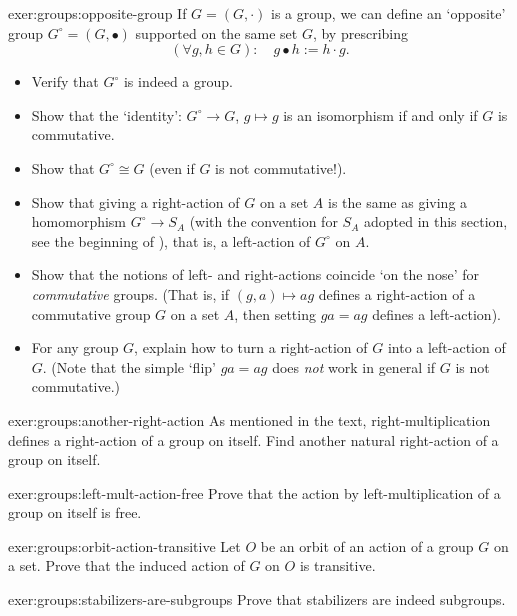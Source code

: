 \begin{exer}{\exerused}{exer:groups:opposite-group}
  If $G = (G, \cdot)$ is a group, we can define an `opposite' group
  $G^\circ = (G, \bullet)$ supported on the same set $G$, by
  prescribing
  \[
    (\forall g, h \in G) : \quad g \bullet h := h \cdot g.
  \]
  \begin{itemize}
  \item Verify that $G^\circ$ is indeed a group.
  \item Show that the `identity': $G^\circ \to G$, $g \mapsto g$ is an
    isomorphism if and only if $G$ is commutative.
  \item Show that $G^\circ \cong G$ (even if $G$ is not commutative!).
  \item Show that giving a right-action of $G$ on a set $A$ is the
    same as giving a homomorphism $G^\circ \to S_A$ (with the
    convention for $S_A$ adopted in this section, see the beginning of
    ), that is, a left-action of
    $G^\circ$ on $A$.
  \item Show that the notions of left- and right-actions coincide `on
    the nose' for \emph{commutative} groups. (That is, if
    $(g,a) \mapsto ag$ defines a right-action of a commutative group
    $G$ on a set $A$, then setting $ga = ag$ defines a left-action).
  \item For any group $G$, explain how to turn a right-action of $G$
    into a left-action of $G$. (Note that the simple `flip' $ga = ag$
    does \emph{not} work in general if $G$ is not commutative.)
  \end{itemize}
\end{exer}
\begin{exer}{}{exer:groups:another-right-action}
  As mentioned in the text, right-multiplication defines a
  right-action of a group on itself. Find another natural right-action
  of a group on itself.
\end{exer}
\begin{exer}{}{exer:groups:left-mult-action-free}
  Prove that the action by left-multiplication of a group on itself is
  free.
\end{exer}
\begin{exer}{}{exer:groups:orbit-action-transitive}
  Let $O$ be an orbit of an action of a group $G$ on a set. Prove that
  the induced action of $G$ on $O$ is transitive.
\end{exer}
\begin{exer}{}{exer:groups:stabilizers-are-subgroups}
  Prove that stabilizers are indeed subgroups.
\end{exer}
